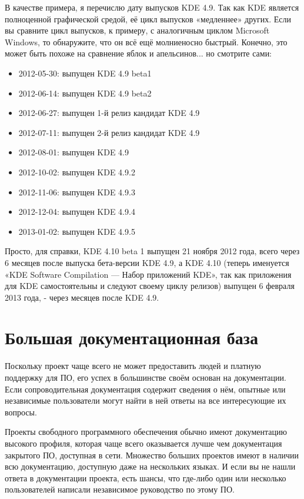 \documentclass[10pt]{book}
\begin{document}
В качестве примера, я перечислю дату выпусков KDE 4.9. Так как KDE является полноценной графической средой, её цикл выпусков «медленнее» других. Если вы сравните цикл выпусков, к примеру, с аналогичным циклом Microsoft Windows, то обнаружите, что он всё ещё молниеносно быстрый.  Конечно, это может быть похоже на сравнение яблок и апельсинов... но смотрите сами:
\begin{itemize}
	\item 2012-05-30: выпущен KDE 4.9 beta1
	\item 2012-06-14: выпущен KDE 4.9 beta2
	\item 2012-06-27: выпущен 1-й релиз кандидат KDE 4.9 
	\item 2012-07-11: выпущен 2-й релиз кандидат KDE 4.9
	\item 2012-08-01: выпущен KDE 4.9 
	\item 2012-10-02: выпущен KDE 4.9.2
	\item 2012-11-06: выпущен KDE 4.9.3
	\item 2012-12-04: выпущен KDE 4.9.4
	\item 2013-01-02: выпущен KDE 4.9.5
\end{itemize}

Просто, для справки, KDE 4.10 beta 1 выпущен 21 ноября 2012 года, всего через 6 месяцев после выпуска бета-версии KDE 4.9, а KDE 4.10 (теперь именуется «KDE Software Compilation — Набор приложений KDE», так как приложения для KDE самостоятельны и следуют своему циклу релизов) выпущен 6 февраля 2013 года, - через  месяцев после KDE 4.9.

\section{Большая документационная база}

Поскольку проект чаще всего не может предоставить людей и платную поддержку для ПО, его успех в большинстве своём основан на документации. Если сопроводительная документация содержит сведения о нём, опытные или независимые пользователи могут найти в ней ответы на все интересующие их вопросы.

Проекты свободного программного обеспечения обычно имеют документацию высокого профиля, которая чаще всего оказывается лучше чем документация закрытого ПО, доступная в сети. Множество больших проектов имеют в наличии всю документацию, доступную  даже на нескольких языках. И если вы не нашли ответа в документации проекта, есть шансы, что где-либо один или несколько пользователей написали независимое руководство по этому ПО.
\end{document}

